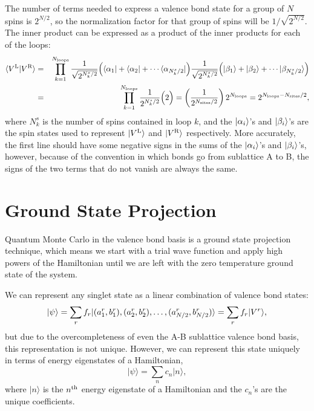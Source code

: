 The number of terms needed to express a valence bond state for a group of $N$ spins is $2^{N/2}$, so the normalization factor for that group of spins will be $1/\sqrt{2^{N/2}}$.
The inner product can be expressed as a product of the inner products for each of the loops:
\begin{eqnarray}
\langle{V^\text{L}}\vert{V^\text{R}}\rangle &= &
				\prod^{N_{\text{loops}}}_{k=1}
				\frac{1}
				{\sqrt{2^{N^s_k/2}}}
				\Big( \langle {\alpha_1} \rvert + \langle {\alpha_2} \rvert + \cdots \langle {\alpha_{N^s_k/2}} \rvert\Big)
				\frac{1}
				{\sqrt{2^{N^s_k/2}}} \nonumber
				\Big( \lvert {\beta_1} \rangle + \lvert {\beta_2} \rangle + \cdots \lvert {\beta_{N^s_k/2}} \rangle\Big)\\
				&=&\prod^{N_{\text{loops}}}_{k=1}
				\frac{1}
				{2^{N^s_k/2}}
				\Big( 2\Big)
				= \left(\frac{1}
				{2^{N_{\text{sites}}/2}}\right)
				 2^{N_{\text{loops}}} 
				 = 2^{N_{\text{loops}} - N_{\text{sites}}/2},
\end{eqnarray}
where $N^s_k$ is the number of spins contained in loop $k$, and the $\lvert {\alpha_i} \rangle$'s and 
$\lvert {\beta_i} \rangle$'s are the spin states used to represent $\lvert {V^\text{L}} \rangle$ and $\lvert {V^\text{R}} \rangle$ respectively.
More accurately, the first line should have some negative signs in the sums of the 
$\lvert {\alpha_i} \rangle$'s and 
$\lvert {\beta_i} \rangle$'s, however, because of the convention in which bonds go from sublattice A to B, the signs of the two terms that do not vanish are always the same.




\section{Ground State Projection} \label{gsp}

Quantum Monte Carlo in the valence bond basis is a ground state projection technique, 
which means we start with a trial wave function and apply high powers of the Hamiltonian until 
we are left with the zero temperature ground state of the system. 

We can represent any singlet state as a linear combination of valence bond states:
\begin{equation}
	\lvert {\psi} \rangle = \sum_r f_r \lvert {(a_1^r,b_1^r),(a_2^r,b_2^r),\dots,(a_{N/2}^r,b_{N/2}^r)} \rangle
	=  \sum_r f_r \lvert {V^r} \rangle,
\end{equation}
but due to the overcompleteness of even the A-B sublattice valence bond basis, this representation is not unique.
However, we can represent this state uniquely in terms of energy eigenstates of a Hamiltonian,
\begin{equation}
\lvert \psi \rangle = \sum_n c_n \lvert n \rangle,
\label{state}
\end{equation}
where $\lvert n \rangle$ is the $n^{\rm{th}}$ energy eigenstate of a Hamiltonian and the 
$c_n$\!'s are
the unique coefficients.

